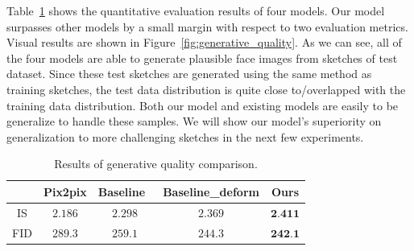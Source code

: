 Table~\ref{tab:generative_quality} shows the quantitative evaluation results of four models. Our model surpasses other models by a small margin with respect to two evaluation metrics. 
Visual results are shown in Figure~\ref{fig:generative_quality}. As we can see, all of the four models are able to generate plausible face images from sketches of test dataset. Since these test sketches are generated using the same method as training sketches, the test data distribution is quite close to/overlapped with the training data distribution. Both our model and existing models are easily to be generalize to handle these samples. We will show our model's superiority on generalization to more challenging sketches in the next few experiments.



\begin{table}[h]
	\centering	
	\caption{Results of generative quality comparison.}
	\begin{tabular}{|c|c|c|c|c|}\hline
		& Pix2pix \cite{pix2pix} & Baseline~\cite{pix2pixHD} & Baseline\_deform & Ours \\\hline
		IS & $2.186$ & $2.298$ & $2.369$ & $\textbf{2.411}$\\\hline
		FID & $289.3$ & $259.1$ & $244.3$ & $\textbf{242.1}$\\\hline
	\end{tabular}
	\label{tab:generative_quality}
\end{table} 

